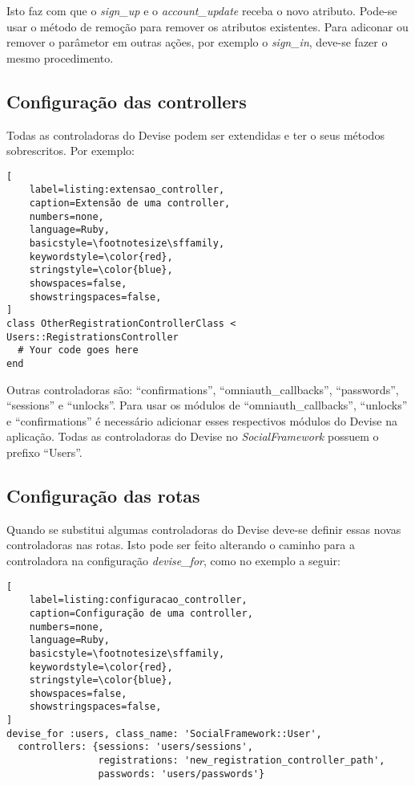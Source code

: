 Isto faz com que o \textit{sign\_up} e o \textit{account\_update} receba o novo atributo. Pode-se usar o método de remoção para remover os atributos existentes. Para adiconar ou remover o parâmetor em outras ações, por exemplo o \textit{sign\_in}, deve-se fazer o mesmo procedimento.

\subsection{Configuração das controllers}

Todas as controladoras do Devise podem ser extendidas e ter o seus métodos sobrescritos. Por exemplo:

\begin{lstlisting}[
    label=listing:extensao_controller,
    caption=Extensão de uma controller,
    numbers=none,
    language=Ruby,
    basicstyle=\footnotesize\sffamily,
    keywordstyle=\color{red},
    stringstyle=\color{blue},
    showspaces=false,
    showstringspaces=false,
]
class OtherRegistrationControllerClass < Users::RegistrationsController
  # Your code goes here
end
\end{lstlisting}

Outras controladoras são: ``confirmations'', ``omniauth\_callbacks'', ``passwords'', ``sessions'' e ``unlocks''. Para usar os módulos de ``omniauth\_callbacks'', ``unlocks'' e ``confirmations'' é necessário adicionar esses respectivos módulos do Devise na aplicação. Todas as controladoras do Devise no \textit{SocialFramework} possuem o prefixo ``Users''.

\subsection{Configuração das rotas}

Quando se substitui algumas controladoras do Devise deve-se definir essas novas controladoras nas rotas. Isto pode ser feito alterando o caminho para a controladora na configuração \textit{devise\_for}, como no exemplo a seguir:

\begin{lstlisting}[
    label=listing:configuracao_controller,
    caption=Configuração de uma controller,
    numbers=none,
    language=Ruby,
    basicstyle=\footnotesize\sffamily,
    keywordstyle=\color{red},
    stringstyle=\color{blue},
    showspaces=false,
    showstringspaces=false,
]
devise_for :users, class_name: 'SocialFramework::User',
  controllers: {sessions: 'users/sessions',
                registrations: 'new_registration_controller_path',
                passwords: 'users/passwords'}
\end{lstlisting}

